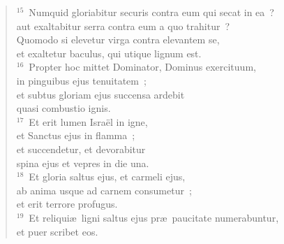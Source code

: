 \begin{verse}
${}^{15}$~Numquid gloriabitur securis contra eum qui secat in ea~?\\ aut exaltabitur serra contra eum a quo trahitur~?\\ Quomodo si elevetur virga contra elevantem se,\\ et exaltetur baculus, qui utique lignum est.\\
${}^{16}$~Propter hoc mittet Dominator, Dominus exercituum,\\ in pinguibus ejus tenuitatem~;\\ et subtus gloriam ejus succensa ardebit\\ quasi combustio ignis.\\
${}^{17}$~Et erit lumen Isra\"el in igne,\\ et Sanctus ejus in flamma~;\\ et succendetur, et devorabitur\\ spina ejus et vepres in die una.\\
${}^{18}$~Et gloria saltus ejus, et carmeli ejus,\\ ab anima usque ad carnem consumetur~;\\ et erit terrore profugus.\\
${}^{19}$~Et reliqui\ae\ ligni saltus ejus pr\ae\ paucitate numerabuntur,\\ et puer scribet eos.\end{verse}


